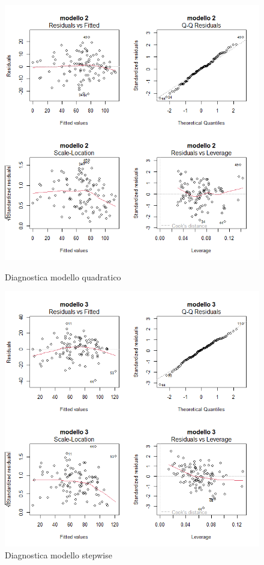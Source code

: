 \begin{figure}[H]
	\centering
	\begin{minipage}{0.48\textwidth}
		\centering
		\includegraphics[width=\linewidth]{../graphs/diagnostica/diagnostica_quadrato}
		\caption{Diagnostica modello quadratico}
		\label{fig:diagnostica_quadrato}
	\end{minipage}
	\hfill
	\begin{minipage}{0.48\textwidth}
		\centering
		\includegraphics[width=\linewidth]{../graphs/diagnostica/diagnostica_stepwise}
		\caption{Diagnostica modello stepwise}
		\label{fig:diagnostica_stepwise}
	\end{minipage}
\end{figure}
